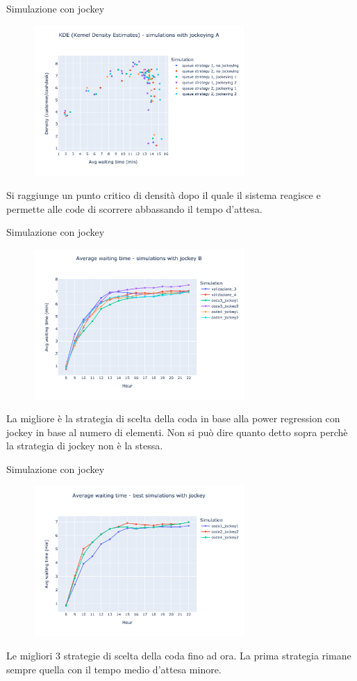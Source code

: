 \begin{frame}{Simulazione con jockey}
	\begin{figure}[H]
		\centering
		\includegraphics[width=8cm]{"../report/images/results/kde_jockey_a.png"}
	\end{figure}
	Si raggiunge un punto critico di densità dopo il quale il sistema reagisce e permette alle code di scorrere abbassando il tempo d'attesa.
\end{frame}

\begin{frame}{Simulazione con jockey}
	\begin{figure}[H]
		\centering
		\includegraphics[width=8cm]{"../report/images/results/avg_wt_jockey_b.png"}
	\end{figure}
	La migliore è la strategia di scelta della coda in base alla power regression con jockey in base al numero di elementi. Non si può dire quanto detto sopra perchè la strategia di jockey non è la stessa.
\end{frame}

\begin{frame}{Simulazione con jockey}
	\begin{figure}[H]
		\centering
		\includegraphics[width=8cm]{"../report/images/results/avg_wt_jockey_best.png"}
	\end{figure}
	Le migliori 3 strategie di scelta della coda fino ad ora. La prima strategia rimane sempre quella con il tempo medio d'attesa minore.
\end{frame}

